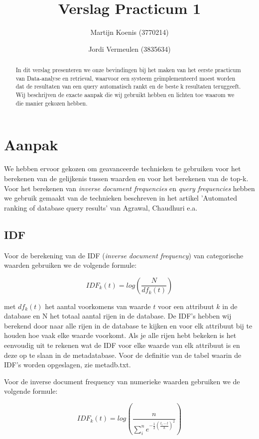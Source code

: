 \documentclass[a4paper,oneside]{article}
\begin{document}
\title{Verslag Practicum 1}
\author{Martijn Koenis (3770214) \and Jordi Vermeulen (3835634)}
\date{}
\maketitle


\begin{abstract}
In dit verslag presenteren we onze bevindingen bij het maken van het eerste practicum van Data-analyse en retrieval, waarvoor een systeem ge\"implementeerd moest worden dat de resultaten van een query automatisch rankt en de beste k resultaten teruggeeft. Wij beschrijven de exacte aanpak die wij gebruikt hebben en lichten toe waarom we die manier gekozen hebben.
\end{abstract}


\section{Aanpak}
We hebben ervoor gekozen om geavanceerde technieken te gebruiken voor het berekenen van de gelijkenis tussen waarden en voor het berekenen van de  top-k. Voor het berekenen van \emph{inverse document frequencies} en \emph{query frequencies} hebben we gebruik gemaakt van de technieken beschreven in het artikel 'Automated ranking of database query results' van Agrawal, Chaudhuri e.a.


\subsection{IDF}
Voor de berekening van de IDF (\emph{inverse document frequency}) van categorische waarden gebruiken we de volgende formule:

$$IDF_k(t) = log\left(\frac{N}{df_k(t)}\right)$$

\noindent
met $df_k(t)$ het aantal voorkomens van waarde $t$ voor een attribuut $k$ in de database en N het totaal aantal rijen in de database. De IDF's hebben wij berekend door naar alle rijen in de database te kijken en voor elk attribuut bij te houden hoe vaak elke waarde voorkomt. Als je alle rijen hebt bekeken is het eenvoudig uit te rekenen wat de IDF voor elke waarde van elk attribuut is en deze op te slaan in de metadatabase. Voor de definitie van de tabel waarin de IDF's worden opgeslagen, zie metadb.txt.

Voor de inverse document frequency van numerieke waarden gebruiken we de volgende formule:

$$IDF_k(t) = log\left(\frac{n}{\sum\limits_i^n e^{-\frac{1}{2}\left(\frac{t_i-t}{h}\right)^2}}\right)$$
\end{document}
